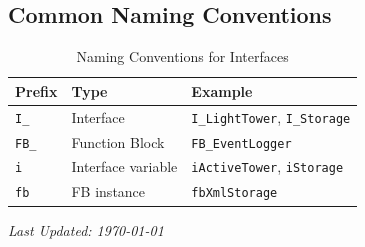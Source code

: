 \documentclass[11pt,a4paper]{article}
\begin{document}
\subsection*{Common Naming Conventions}

\begin{table}[h]
\centering
\begin{tabular}{@{}lll@{}}
\toprule
\textbf{Prefix} & \textbf{Type} & \textbf{Example} \\
\midrule
\texttt{I\_} & Interface & \texttt{I\_LightTower}, \texttt{I\_Storage} \\
\texttt{FB\_} & Function Block & \texttt{FB\_EventLogger} \\
\texttt{i} & Interface variable & \texttt{iActiveTower}, \texttt{iStorage} \\
\texttt{fb} & FB instance & \texttt{fbXmlStorage} \\
\bottomrule
\end{tabular}
\caption{Naming Conventions for Interfaces}
\end{table}

\vfill

\begin{center}
\textit{Last Updated: \today}
\end{center}
\end{document}
